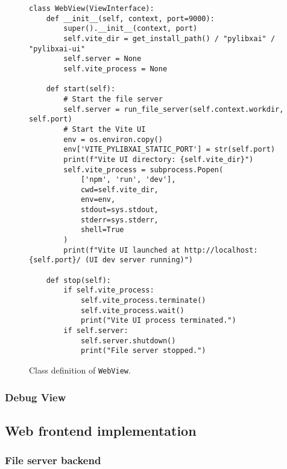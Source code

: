 \documentclass[
    bindingoffset=5mm,  %
    footnoteindent=3mm, %
    hyphenation=true    %
]{src/wut-thesis}
\newtheorem{example}{Example}
\begin{document}
\begin{figure}%
\begin{verbatim}
class WebView(ViewInterface):
    def __init__(self, context, port=9000):
        super().__init__(context, port)
        self.vite_dir = get_install_path() / "pylibxai" / "pylibxai-ui"
        self.server = None
        self.vite_process = None

    def start(self):
        # Start the file server
        self.server = run_file_server(self.context.workdir, self.port)
        # Start the Vite UI
        env = os.environ.copy()
        env['VITE_PYLIBXAI_STATIC_PORT'] = str(self.port)
        print(f"Vite UI directory: {self.vite_dir}")
        self.vite_process = subprocess.Popen(
            ['npm', 'run', 'dev'],
            cwd=self.vite_dir,
            env=env,
            stdout=sys.stdout,
            stderr=sys.stderr,
            shell=True
        )
        print(f"Vite UI launched at http://localhost:{self.port}/ (UI dev server running)")

    def stop(self):
        if self.vite_process:
            self.vite_process.terminate()
            self.vite_process.wait()
            print("Vite UI process terminated.")
        if self.server:
            self.server.shutdown()
            print("File server stopped.")
\end{verbatim}
\caption{Class definition of \texttt{WebView}.}
\label{fig:WebView}
\end{figure}
 
\subsubsection{Debug View}

\subsection{Web frontend implementation} \label{ch:ch5WebFrontend}


\subsubsection{File server backend} \label{ch5:FileServer}

\end{document}
